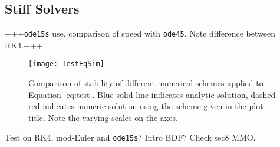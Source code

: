 \subsection{Stiff Solvers}
+++\texttt{ode15s} use, comparison of speed with \texttt{ode45}. Note difference between RK4.+++
\begin{figure}
	\centering
	\texttt{[image: TestEqSim]}
	\caption[Numerical Stability Comparison]{Comparison of stability of different numerical schemes applied to Equation \ref{eq:test}. Blue solid line indicates analytic solution, dashed red indicates numeric solution using the scheme given in the plot title. Note the varying scales on the axes.}

\end{figure}


		Test on RK4, mod-Euler and \texttt{ode15s}? Intro BDF? Check sec8 MMO.

